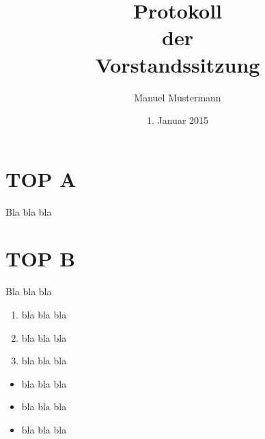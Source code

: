 \documentclass[12pt,paper=a4,ngerman]{scrreprt}
\title{Protokoll\\der\\Vorstandssitzung}
\author{Manuel Mustermann}
\date{1. Januar 2015}
\begin{document}
\maketitle

\tableofcontents

\newpage


\section{TOP A}
\label{sec:top_a}

Bla bla bla


\section{TOP B}
\label{sec:top_b}

Bla bla bla


\begin{enumerate}
\item bla bla bla
\item bla bla bla
\item bla bla bla
\end{enumerate}


\begin{itemize}
\item bla bla bla
\item bla bla bla
\item bla bla bla
\end{itemize}
\end{document}
